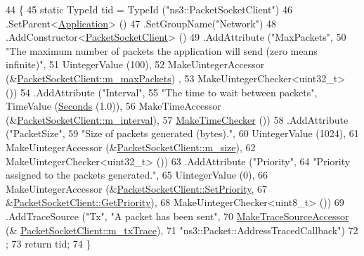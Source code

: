 \begin{DoxyCode}
44 \{
45   \textcolor{keyword}{static} TypeId tid = TypeId (\textcolor{stringliteral}{"ns3::PacketSocketClient"})
46     .SetParent<\hyperlink{classns3_1_1Application_acd261926c72b02cdb48fc7f8838ee173}{Application}> ()
47     .SetGroupName(\textcolor{stringliteral}{"Network"})
48     .AddConstructor<\hyperlink{classns3_1_1PacketSocketClient_aabfe4375491e38176de051f1832094b2}{PacketSocketClient}> ()
49     .AddAttribute (\textcolor{stringliteral}{"MaxPackets"},
50                    \textcolor{stringliteral}{"The maximum number of packets the application will send (zero means infinite)"},
51                    UintegerValue (100),
52                    MakeUintegerAccessor (&\hyperlink{classns3_1_1PacketSocketClient_a817894ce70a1b601173d05024b75fe34}{PacketSocketClient::m\_maxPackets})
      ,
53                    MakeUintegerChecker<uint32\_t> ())
54     .AddAttribute (\textcolor{stringliteral}{"Interval"},
55                    \textcolor{stringliteral}{"The time to wait between packets"}, TimeValue (\hyperlink{group__timecivil_ga33c34b816f8ff6628e33d5c8e9713b9e}{Seconds} (1.0)),
56                    MakeTimeAccessor (&\hyperlink{classns3_1_1PacketSocketClient_afb41dce3dd3ac9e9cf003bf6cac01cdc}{PacketSocketClient::m\_interval}),
57                    \hyperlink{group__time_ga7032965bd4afa578691d88c09e4481c1}{MakeTimeChecker} ())
58     .AddAttribute (\textcolor{stringliteral}{"PacketSize"},
59                    \textcolor{stringliteral}{"Size of packets generated (bytes)."},
60                    UintegerValue (1024),
61                    MakeUintegerAccessor (&\hyperlink{classns3_1_1PacketSocketClient_ae7e5d512ebeee9d3fb2c9a72f201dc63}{PacketSocketClient::m\_size}),
62                    MakeUintegerChecker<uint32\_t> ())
63     .AddAttribute (\textcolor{stringliteral}{"Priority"},
64                    \textcolor{stringliteral}{"Priority assigned to the packets generated."},
65                    UintegerValue (0),
66                    MakeUintegerAccessor (&\hyperlink{classns3_1_1PacketSocketClient_a93229ac3c07d5e6a049d515a684cc15a}{PacketSocketClient::SetPriority},
67                                          &\hyperlink{classns3_1_1PacketSocketClient_a61245cdcc0e0d6a077288211991741be}{PacketSocketClient::GetPriority}),
68                    MakeUintegerChecker<uint8\_t> ())
69     .AddTraceSource (\textcolor{stringliteral}{"Tx"}, \textcolor{stringliteral}{"A packet has been sent"},
70                      \hyperlink{group__tracing_gab21a770b9855af4e8f69f7531ea4a6b0}{MakeTraceSourceAccessor} (&
      \hyperlink{classns3_1_1PacketSocketClient_ad771026f2bfd7c6202be47d0f17f9582}{PacketSocketClient::m\_txTrace}),
71                      \textcolor{stringliteral}{"ns3::Packet::AddressTracedCallback"})
72   ;
73   \textcolor{keywordflow}{return} tid;
74 \}
\end{DoxyCode}


